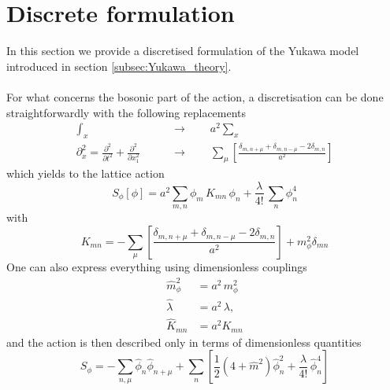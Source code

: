 \section{Discrete formulation}
\label{sec:lattice_discretisation}
In this section we provide a discretised formulation of the Yukawa model introduced in section \ref{subsec:Yukawa_theory}. \\~\\
For what concerns the bosonic part of the action, a discretisation can be done straightforwardly with the following replacements
\begin{equation*}
    \begin{aligned}
        \int_x \qquad &\to \qquad a^2 \sum_x \\
        \partial^2_x = \frac{\partial^2}{\partial t^2} + \frac{\partial^2}{\partial x_1^2} \qquad &\to \qquad \sum_\mu \left[\frac{\delta_{m,n+\mu} + \delta_{m,n-\mu} - 2 \delta_{m,n}}{a^2}\right]
    \end{aligned}
\end{equation*}
which yields to the lattice action
\begin{equation*}
        S_\phi [\phi] =  a^2 \sum_{m,n} \phi_m \, K_{mn} \, \phi_n + \frac{\lambda}{4!} \, \sum_n \phi_n^4 
\end{equation*}
with 
\begin{equation*}
    K_{mn} = - \sum_\mu \left[\frac{\delta_{m,n+\mu} + \delta_{m,n-\mu} - 2 \delta_{m,n}}{a^2}\right] + m_\phi^2 \delta_{mn} 
\end{equation*}
One can also express everything using dimensionless couplings
\begin{equation}
    \begin{aligned}
        \hat m_\phi^2 &= a^2 \, m_\phi^2 \\
        \hat \lambda &= a^{2} \, \lambda, \\
        \hat K_{mn} &= a^2 K_{mn}
    \end{aligned}
    \label{eq:couplings_redefitinion}
\end{equation}
and the action is then described only in terms of dimensionless quantities
\begin{equation*}
    S_\phi=-\sum_{n, \mu} \hat\phi_n \hat\phi_{n+\mu}+\sum_n\left[\frac{1}{2}\left(4+\hat m^2\right) \hat\phi_n^2 +\frac{\hat\lambda}{4 !} \, \hat\phi_n^4\right]
\end{equation*}
